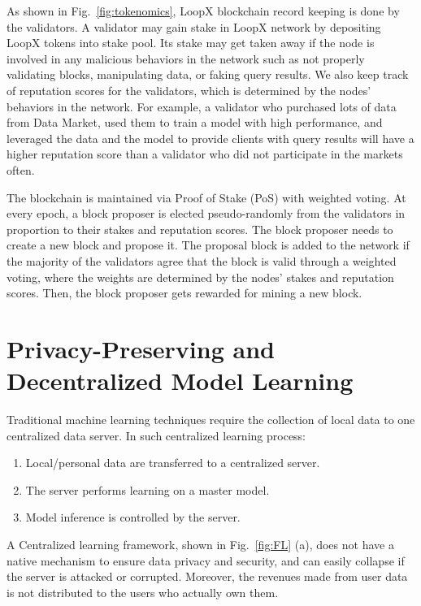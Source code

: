 \documentclass[11pt,letterpaper]{article}
\begin{document}
As shown in  Fig.~\ref{fig:tokenomics}, LoopX blockchain record keeping is done by the validators. A validator may gain stake in LoopX network by depositing LoopX tokens into stake pool. Its stake may get taken away if the node is involved in any malicious behaviors in the network such as not properly validating blocks, manipulating data, or faking query results. We also keep track of reputation scores for the validators, which is determined by the nodes' behaviors in the network. For example, a validator who purchased lots of data from Data Market, used them to train a model with high performance, and leveraged the data and the model to provide clients with query results will have a higher reputation score than a validator who did not participate in the markets often.

The blockchain is maintained via Proof of Stake (PoS) with weighted voting. At every epoch, a block proposer is elected pseudo-randomly from the validators in proportion to their stakes and reputation scores. The block proposer needs to create a new block and propose it. The proposal block is added to the network if the majority of the validators agree that the block is valid through a weighted voting, where the weights are determined by the nodes' stakes and reputation scores. Then, the block proposer gets rewarded for mining a new block.

\section{Privacy-Preserving and Decentralized Model Learning}


Traditional machine learning techniques require the collection of local data to one centralized data server. In such centralized learning process:
\begin{enumerate}
  \item Local/personal data are transferred to a centralized server.
  \item The server performs learning on a master model.
  \item Model inference is controlled by the server.
\end{enumerate}
A Centralized learning framework, shown in Fig.~\ref{fig:FL} (a), does not have a native mechanism to ensure data privacy and security, and can easily collapse if the server is attacked or corrupted. Moreover, the revenues made from user data is not distributed to the users who actually own them. 
\end{document}
